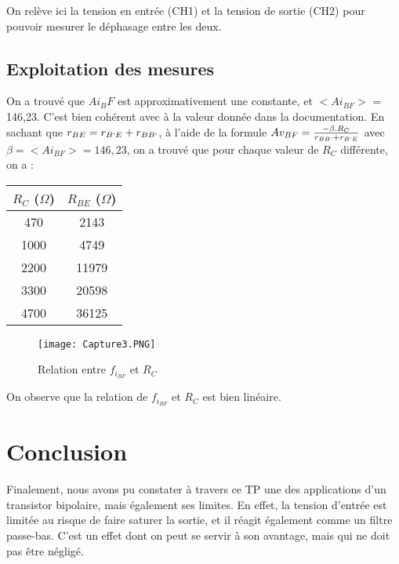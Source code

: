 \documentclass{article}
\begin{document}
On relève ici la tension en entrée (CH1) et la tension de sortie (CH2) pour pouvoir mesurer le déphasage entre les deux.

\subsection{Exploitation des mesures}
On a trouvé que $Ai_BF$ est approximativement une constante, et $<Ai_{BF}>$ = 146,23. C'est bien cohérent avec à la valeur donnée dans la documentation.
En sachant que $r_{BE} = r_{B`E} + r_{BB`}$, à l'aide de la formule $Av_{BF} = \frac{- \beta.R_C}{r_{BB`} + r_{B`E}}$ avec $\beta=<Ai_{BF}>=146,23$, on a trouvé que pour chaque valeur de $R_C$ différente, on a :

\begin{center}
    \begin{tabular}{||c | c||}
    \hline
    $R_C$ ($\Omega$) & $R_{BE}$ ($\Omega$)\\
    \hline
    \hline
    470  & 2143\\
    \hline
    1000  & 4749\\
    \hline
    2200  & 11979\\
    \hline
    3300  & 20598\\
    \hline
    4700  & 36125\\
    \hline
    \end{tabular}
\end{center}

\begin{figure}[h!]
\centering
\texttt{[image: Capture3.PNG]}
\caption{Relation entre $f_{i_{BF}}$ et $R_C$}
\label{fig:f}
\end{figure}

On observe que la relation de $f_{i_{BF}}$ et $R_C$ est bien linéaire.



\section{Conclusion}
Finalement, nous avons pu constater à travers ce TP une des applications d’un transistor bipolaire, mais également ses limites. En effet, la tension d’entrée est limitée au risque de faire saturer la sortie, et il réagit également comme un filtre passe-bas. C’est un effet dont on peut se servir à son avantage, mais qui ne doit pas être négligé.
\end{document}
